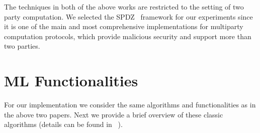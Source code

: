 \documentclass{article}
\begin{document}
The techniques in both of the above works are restricted to the setting of two party computation. We selected the SPDZ~\cite{SPDZ12,KPR18,KSS13} framework for our experiments since it is one of the main and most comprehensive 
implementations for multiparty computation protocols, which provide malicious security and support more than two parties.

\section{ML Functionalities}

For our implementation we consider the same algorithms and functionalities as in the above two papers. Next we provide a brief overview of these classic algorithms (details can be found in ~\cite{HTF09}).


\end{document}
